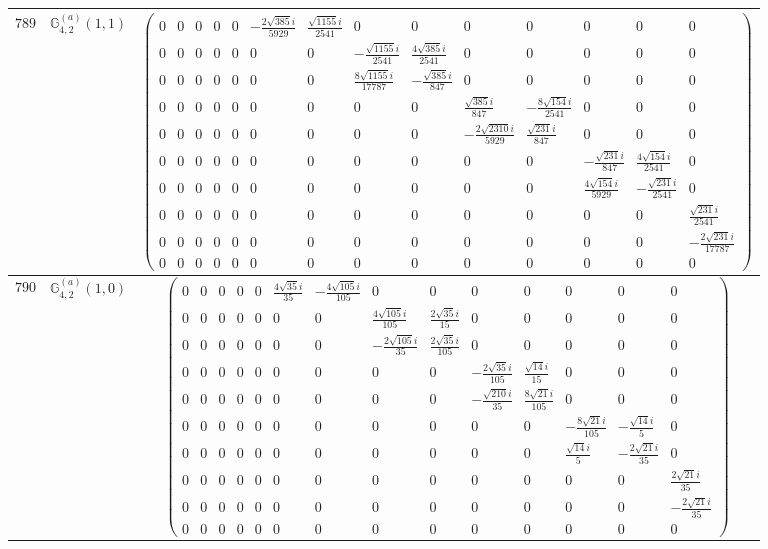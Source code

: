\documentclass[fleqn,8pt,landscape]{jsarticle}
\begin{document}
\begin{center}
\begin{longtable}{ccc}
$ 789 $ & $ \mathbb{G}_{4,2}^{(a)}(1,1) $ & $ \begin{pmatrix} 0 & 0 & 0 & 0 & 0 & - \frac{2 \sqrt{385} i}{5929} & \frac{\sqrt{1155} i}{2541} & 0 & 0 & 0 & 0 & 0 & 0 & 0 \\ 0 & 0 & 0 & 0 & 0 & 0 & 0 & - \frac{\sqrt{1155} i}{2541} & \frac{4 \sqrt{385} i}{2541} & 0 & 0 & 0 & 0 & 0 \\ 0 & 0 & 0 & 0 & 0 & 0 & 0 & \frac{8 \sqrt{1155} i}{17787} & - \frac{\sqrt{385} i}{847} & 0 & 0 & 0 & 0 & 0 \\ 0 & 0 & 0 & 0 & 0 & 0 & 0 & 0 & 0 & \frac{\sqrt{385} i}{847} & - \frac{8 \sqrt{154} i}{2541} & 0 & 0 & 0 \\ 0 & 0 & 0 & 0 & 0 & 0 & 0 & 0 & 0 & - \frac{2 \sqrt{2310} i}{5929} & \frac{\sqrt{231} i}{847} & 0 & 0 & 0 \\ 0 & 0 & 0 & 0 & 0 & 0 & 0 & 0 & 0 & 0 & 0 & - \frac{\sqrt{231} i}{847} & \frac{4 \sqrt{154} i}{2541} & 0 \\ 0 & 0 & 0 & 0 & 0 & 0 & 0 & 0 & 0 & 0 & 0 & \frac{4 \sqrt{154} i}{5929} & - \frac{\sqrt{231} i}{2541} & 0 \\ 0 & 0 & 0 & 0 & 0 & 0 & 0 & 0 & 0 & 0 & 0 & 0 & 0 & \frac{\sqrt{231} i}{2541} \\ 0 & 0 & 0 & 0 & 0 & 0 & 0 & 0 & 0 & 0 & 0 & 0 & 0 & - \frac{2 \sqrt{231} i}{17787} \\ 0 & 0 & 0 & 0 & 0 & 0 & 0 & 0 & 0 & 0 & 0 & 0 & 0 & 0 \end{pmatrix} $ \\ \hline
$ 790 $ & $ \mathbb{G}_{4,2}^{(a)}(1,0) $ & $ \begin{pmatrix} 0 & 0 & 0 & 0 & 0 & \frac{4 \sqrt{35} i}{35} & - \frac{4 \sqrt{105} i}{105} & 0 & 0 & 0 & 0 & 0 & 0 & 0 \\ 0 & 0 & 0 & 0 & 0 & 0 & 0 & \frac{4 \sqrt{105} i}{105} & \frac{2 \sqrt{35} i}{15} & 0 & 0 & 0 & 0 & 0 \\ 0 & 0 & 0 & 0 & 0 & 0 & 0 & - \frac{2 \sqrt{105} i}{35} & \frac{2 \sqrt{35} i}{105} & 0 & 0 & 0 & 0 & 0 \\ 0 & 0 & 0 & 0 & 0 & 0 & 0 & 0 & 0 & - \frac{2 \sqrt{35} i}{105} & \frac{\sqrt{14} i}{15} & 0 & 0 & 0 \\ 0 & 0 & 0 & 0 & 0 & 0 & 0 & 0 & 0 & - \frac{\sqrt{210} i}{35} & \frac{8 \sqrt{21} i}{105} & 0 & 0 & 0 \\ 0 & 0 & 0 & 0 & 0 & 0 & 0 & 0 & 0 & 0 & 0 & - \frac{8 \sqrt{21} i}{105} & - \frac{\sqrt{14} i}{5} & 0 \\ 0 & 0 & 0 & 0 & 0 & 0 & 0 & 0 & 0 & 0 & 0 & \frac{\sqrt{14} i}{5} & - \frac{2 \sqrt{21} i}{35} & 0 \\ 0 & 0 & 0 & 0 & 0 & 0 & 0 & 0 & 0 & 0 & 0 & 0 & 0 & \frac{2 \sqrt{21} i}{35} \\ 0 & 0 & 0 & 0 & 0 & 0 & 0 & 0 & 0 & 0 & 0 & 0 & 0 & - \frac{2 \sqrt{21} i}{35} \\ 0 & 0 & 0 & 0 & 0 & 0 & 0 & 0 & 0 & 0 & 0 & 0 & 0 & 0 \end{pmatrix} $ \\ \hline

\end{longtable}
\end{center}
\end{document}
